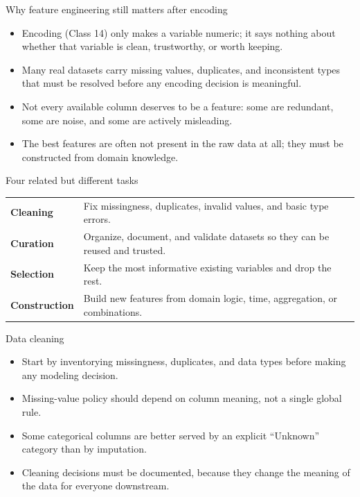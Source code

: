 \begin{frame}{Why feature engineering still matters after encoding}
\begin{itemize}
\item Encoding (Class 14) only makes a variable numeric; it says nothing about whether that variable is clean, trustworthy, or worth keeping.
\item Many real datasets carry missing values, duplicates, and inconsistent types that must be resolved before any encoding decision is meaningful.
\item Not every available column deserves to be a feature: some are redundant, some are noise, and some are actively misleading.
\item The best features are often not present in the raw data at all; they must be constructed from domain knowledge.
\end{itemize}
\coursefooter
\end{frame}

\begin{frame}{Four related but different tasks}
\begin{tabularx}{\textwidth}{>{\bfseries}l X}
Cleaning & Fix missingness, duplicates, invalid values, and basic type errors. \\
Curation & Organize, document, and validate datasets so they can be reused and trusted. \\
Selection & Keep the most informative existing variables and drop the rest. \\
Construction & Build new features from domain logic, time, aggregation, or combinations. \\
\end{tabularx}
\coursefooter
\end{frame}

\begin{frame}{Data cleaning}
\begin{itemize}
\item Start by inventorying missingness, duplicates, and data types before making any modeling decision.
\item Missing-value policy should depend on column meaning, not a single global rule.
\item Some categorical columns are better served by an explicit ``Unknown'' category than by imputation.
\item Cleaning decisions must be documented, because they change the meaning of the data for everyone downstream.
\end{itemize}
\coursefooter
\end{frame}

